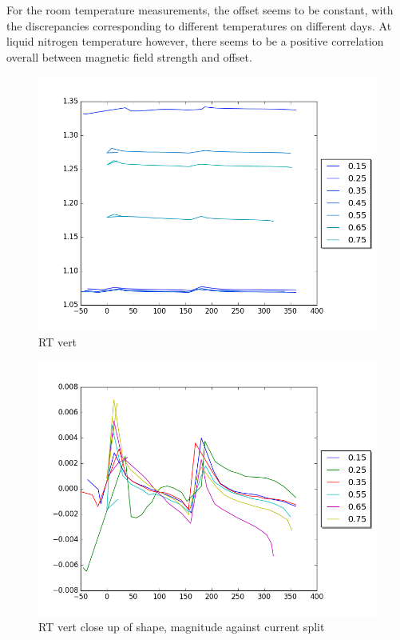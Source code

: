 \documentclass[10pt, twocolumn]{revtex4}
\begin{document}
For the room temperature measurements, the offset seems to be constant, with the discrepancies corresponding to different temperatures on different days. At liquid nitrogen temperature however, there seems to be a positive correlation overall between magnetic field strength and offset.\\  %


\begin{figure}[H]
	\centering
	\includegraphics[width = \columnwidth]{Vert_plot.png}
	\caption{RT vert}
	\label{fig:vert_all}
\end{figure}

\begin{figure}[H]
	\centering
	\includegraphics[width = \columnwidth]{RT_adj_fig_vert.png}
	\caption{RT vert close up of shape, magnitude against current split}
	\label{fig:vert_RT}
\end{figure}
\end{document}
